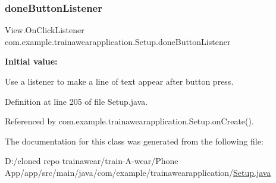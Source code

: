 \subsubsection{\texorpdfstring{doneButtonListener}{doneButtonListener}}
{\footnotesize\ttfamily View.\+On\+Click\+Listener com.\+example.\+trainawearapplication.\+Setup.\+done\+Button\+Listener\hspace{0.3cm}{\ttfamily [private]}}

{\bfseries Initial value\+:}
\begin{DoxyCode}{0}
\DoxyCodeLine{            }
\DoxyCodeLine{}
\DoxyCodeLine{        \}}
\DoxyCodeLine{    \}}

\end{DoxyCode}


Use a listener to make a line of text appear after button press. 



Definition at line 205 of file Setup.\+java.



Referenced by com.\+example.\+trainawearapplication.\+Setup.\+on\+Create().



The documentation for this class was generated from the following file\+:\begin{DoxyCompactItemize}
\item 
D\+:/cloned repo trainawear/train-\/\+A-\/wear/\+Phone App/app/src/main/java/com/example/trainawearapplication/\mbox{\hyperlink{_setup_8java}{Setup.\+java}}\end{DoxyCompactItemize}

